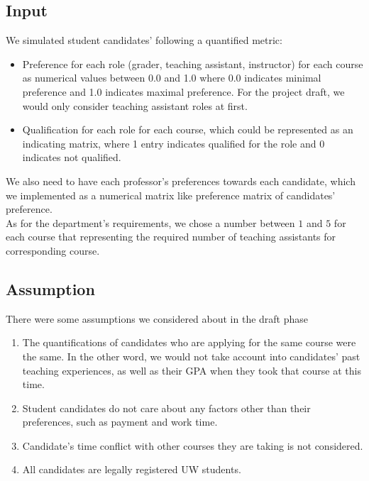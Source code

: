 \documentclass[twoside,twocolumn]{article}
\begin{document}
    \subsection{Input}
    \indent We simulated student candidates' following a quantified metric:
    \begin{itemize}
        \item Preference for each role (grader, teaching assistant, instructor) for each course as numerical values between 0.0 and 
        1.0 where 0.0 indicates minimal preference and 1.0 indicates maximal preference. For the project draft, we would only consider
        teaching assistant roles at first.
        \item Qualification for each role for each course, which could be represented as an indicating matrix, where 1 entry indicates
        qualified for the role and 0 indicates not qualified.
    \end{itemize}
    We also need to have each professor’s preferences towards each candidate, which we implemented as a numerical matrix like preference
    matrix of candidates' preference.
    \\ As for the department’s requirements, we chose a number between $1$ and $5$ for each course that representing the required number of 
    teaching assistants for corresponding course.     
    \subsection{Assumption}
    There were some assumptions we considered about in the draft phase
    \begin{enumerate}
        \item The quantifications of candidates who are applying for the same course were the same. In the other word, we would not take
        account into candidates' past teaching experiences, as well as their GPA when they took that course at this time.
        \item Student candidates do not care about any factors other than their preferences, such as payment and work time.
        \item Candidate's time conflict with other courses they are taking is not considered.
        \item All candidates are legally registered UW students.
    \end{enumerate}
\end{document}
